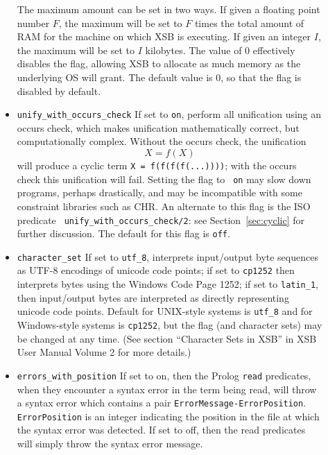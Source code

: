 \begin{description}
\begin{itemize}
  The maximum amount can be set in two ways.  If given a floating
  point number $F$, the maximum will be set to $F$ times the total
  amount of RAM for the machine on which XSB is executing.  If given
  an integer $I$, the maximum will be set to $I$ kilobytes.  The value
  of 0 effectively disables the flag, allowing XSB to allocate as much
  memory as the underlying OS will grant.  The default value is 0, so
  that the flag is disabled by default.

\item {\tt unify\_with\_occurs\_check} If set to {\tt on}, perform all
  unification using an occurs check, which makes unification
  mathematically correct, but computationally complex.  Without the occurs
  check, the unification 
\[
   X = f(X)
\]
  will produce a cyclic term {\tt X = f(f(f(f(...))))}; with the
  occurs check this unification will fail.  Setting the flag to {\tt
    on} may slow down programs, perhaps drastically, and may be
  incompatible with some constraint libraries such as CHR.  An
  alternate to this flag is the ISO predicate {\tt
    unify\_with\_occurs\_check/2}: see Section~\ref{sec:cyclic} for
    further discussion.  The default for this flag is {\tt off}.
%
\item {\tt character\_set} If set to {\tt utf\_8}, interprets
input/output byte sequences as UTF-8 encodings of unicode code points;
if set to {\tt cp1252} then interprets bytes using the Windows Code
Page 1252; if set to {\tt latin\_1}, then input/output bytes are
interpreted as directly representing unicode code points.  Default for
UNIX-style systems is {\tt utf\_8} and for Windows-style systems is
{\tt cp1252}, but the flag (and character sets) may be changed at any
time.  (See section ``Character Sets in XSB'' in XSB User Manual
Volume 2 for more details.)
%
\item {\tt errors\_with\_position} If set to on, then the Prolog
{\tt read} predicates, when they encounter a syntax error in the term
being read, will throw a syntax error which contains a pair
\texttt{ErrorMessage-ErrorPosition}.  {\tt ErrorPosition} is an integer
indicating the position in the file at which the syntax error was
detected. If set to off, then the read predicates will simply throw
the syntax error message.


\end{itemize}
\end{description}
